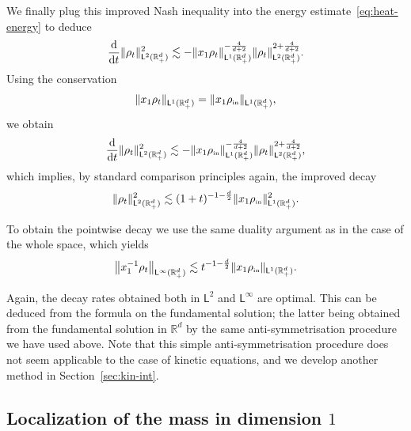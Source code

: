 \documentclass[11pt]{amsart}
\theoremstyle{definition}
\theoremstyle{remark}
\numberwithin{equation}{section}
\newcommand\R{{\mathbb R}}
\newcommand{\dt}{\frac{{\rm d}}{{\rm d}t}}
\newcommand{\init}{\text{{\tiny {\rm in}}}}
\newcommand{\sfL}{\mathsf{L}}
\begin{document}
We finally plug this improved Nash inequality into the energy estimate~\eqref{eq:heat-energy} to deduce
\begin{equation*}
  \dt \| \rho_t \|_{\sfL^{2}(\R_+^d)}^2 \lesssim - \| x_1 \rho_t \|_{\sfL^{1}(\R_+^d)} ^{-\frac{4}{d+2}} \| \rho_t \|_{\sfL^{2}(\R_+^d)}^{2 + \frac{4}{d+2}}.
\end{equation*}
Using the conservation
\begin{equation*}
  \| x_1 \rho_t \|_{\sfL^{1}(\R_+^d)} = \| x_1 \rho_\init \|_{\sfL^{1}(\R_+^d)},
\end{equation*}
we obtain
\begin{equation}
  \label{eq:heat-L2-improved}
  \dt \| \rho_t \|_{\sfL^{2}(\R_+^d)}^2 \lesssim - \| x_1 \rho_\init \|_{\sfL^{1}(\R_+^d)} ^{-\frac{4}{d+2}} \| \rho_t \|_{\sfL^{2}(\R_+^d)}^{2 + \frac{4}{d+2}},
\end{equation}
which implies, by standard comparison principles again, the improved decay
\begin{equation}
  \label{eq:decay-heat-L2}
  \| \rho_t \|_{\sfL^{2}(\R_+^d)}^2 \lesssim (1+t)^{-1- \frac{d}2} \| x_1 \rho_\init \|_{\sfL^{1}(\R_+^d)}^2.
\end{equation}

To obtain the pointwise decay we use the same duality argument as in the case of the whole space, which yields
\begin{equation*}
  \left\| x_1^{-1} \rho_t \right\|_{\sfL^{\infty}(\R_+^d)} \lesssim t^{-1- \frac{d}2} \| x_1 \rho_\init \|_{\sfL^{1}(\R_+^d)}.
\end{equation*}

Again, the decay rates obtained both in $\sfL^{2}$ and $\sfL^{\infty}$ are optimal. This can be deduced from the formula on the fundamental solution; the latter being obtained from the fundamental solution in $\R^d$ by the same anti-symmetrisation procedure we have used above. Note that this simple anti-symmetrisation procedure does not seem applicable to the case of kinetic equations, and we develop another method in Section~\ref{sec:kin-int}.

\subsection{Localization of the mass in dimension $1$}
\label{subsec:localiz-parabolic}
\end{document}
